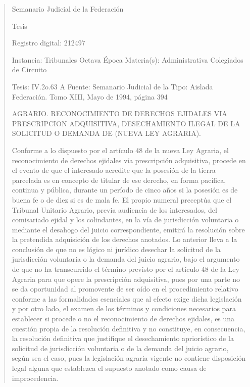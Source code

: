 \documentclass[11pt,a4paper]{article}
\begin{document}
\begin{quote}
                                                   Semanario Judicial de la Federación

                                                  Tesis

 Registro digital: 212497

 Instancia: Tribunales            Octava Época                           Materia(s): Administrativa
 Colegiados de Circuito

 Tesis: IV.2o.63 A                Fuente: Semanario Judicial de la       Tipo: Aislada
                                  Federación.
                                  Tomo XIII, Mayo de 1994, página
                                  394


AGRARIO. RECONOCIMIENTO DE DERECHOS EJIDALES VIA PRESCRIPCION ADQUISITIVA,
DESECHAMIENTO ILEGAL DE LA SOLICITUD O DEMANDA DE (NUEVA LEY AGRARIA).


Conforme a lo dispuesto por el artículo 48 de la nueva Ley Agraria, el reconocimiento de derechos
ejidales vía prescripción adquisitiva, procede en el evento de que el interesado acredite que la
posesión de la tierra parcelada es en concepto de titular de ese derecho, en forma pacífica, continua
y pública, durante un período de cinco años si la posesión es de buena fe o de diez si es de mala fe.
El propio numeral preceptúa que el Tribunal Unitario Agrario, previa audiencia de los interesados,
del comisariado ejidal y los colindantes, en la vía de jurisdicción voluntaria o mediante el desahogo
del juicio correspondiente, emitirá la resolución sobre la pretendida adquisición de los derechos
anotados. Lo anterior lleva a la conclusión de que no es lógico ni jurídico desechar la solicitud de la
jurisdicción voluntaria o la demanda del juicio agrario, bajo el argumento de que no ha transcurrido
el término previsto por el artículo 48 de la Ley Agraria para que opere la prescripción adquisitiva,
pues por una parte no se da oportunidad al promovente de ser oído en el procedimiento relativo
conforme a las formalidades esenciales que al efecto exige dicha legislación y por otro lado, el
examen de los términos y condiciones necesarios para establecer si procede o no el reconocimiento
de derechos ejidales, es una cuestión propia de la resolución definitiva y no constituye, en
consecuencia, la resolución definitiva que justifique el desechamiento apriorístico de la solicitud de
jurisdicción voluntaria o de la demanda del juicio agrario, según sea el caso, pues la legislación
agraria vigente no contiene disposición legal alguna que establezca el supuesto anotado como
causa de improcedencia.


\end{quote}
\end{document}
